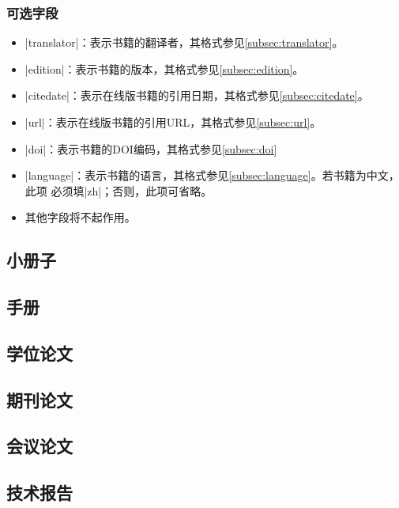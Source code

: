 \subsubsection{可选字段}

\begin{itemize}
\item |translator|：表示书籍的翻译者，其格式参见\ref{subsec:translator}。
\item |edition|：表示书籍的版本，其格式参见\ref{subsec:edition}。
\item |citedate|：表示在线版书籍的引用日期，其格式参见\ref{subsec:citedate}。
\item |url|：表示在线版书籍的引用URL，其格式参见\ref{subsec:url}。
\item |doi|：表示书籍的DOI编码，其格式参见\ref{subsec:doi}
\item |language|：表示书籍的语言，其格式参见\ref{subsec:language}。若书籍为中文，此项
必须填|zh|；否则，此项可省略。
\item 其他字段将不起作用。
\end{itemize}

\subsection{小册子}

\subsection{手册}

\subsection{学位论文}


\subsection{}

\subsection{期刊论文}

\subsection{会议论文}

\subsection{技术报告}

